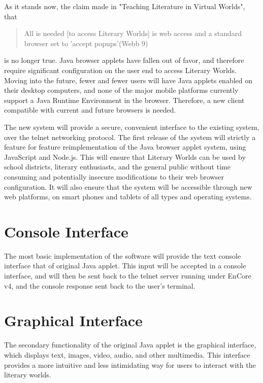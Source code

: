 \documentclass[12pt, letterpaper]{report}
\begin{document}
	\par
	As it stands now, the claim made in "Teaching Literature in Virtual Worlds", that 
	
	\begin{quotation}
    All is needed [to access Literary Worlds] is web access and a standard browser set to 'accept popups'(Webb 9)
	\end{quotation}
	is no longer true. Java browser applets have fallen out of favor, and therefore require significant configuration on the user end to access Literary Worlds. Moving into the future, fewer and fewer users will have Java applets enabled on their desktop computers, and none of the major mobile platforms currently support a Java Runtime Environment in the browser. Therefore, a new client compatible with current and future browsers is needed.
	
	\par
	The new system will provide a secure, convenient interface to the existing system, over the telnet networking protocol. The first release of the system will strictly a feature for feature reimplementation of the Java browser applet system, using JavaScript and Node.js. This will ensure that Literary Worlds can be used by school districts, literary enthusiasts, and the general public without time consuming and potentially insecure modifications to their web browser configuration. It will also ensure that the system will be accessible through new web platforms, on smart phones and tablets of all types and operating systems.
	
	\section{Console Interface}
	The most basic implementation of the software will provide the text console interface that of original Java applet. This input will be accepted in a console interface, and will then be sent back to the telnet server running under EnCore v4, and the console response sent back to the user's terminal.
	
	\section{Graphical Interface}
	The secondary functionality of the original Java applet is the graphical interface, which displays text, images, video, audio, and other multimedia. This interface provides a more intuitive and less intimidating way for users to interact with the literary worlds. 
	
\end{document}
